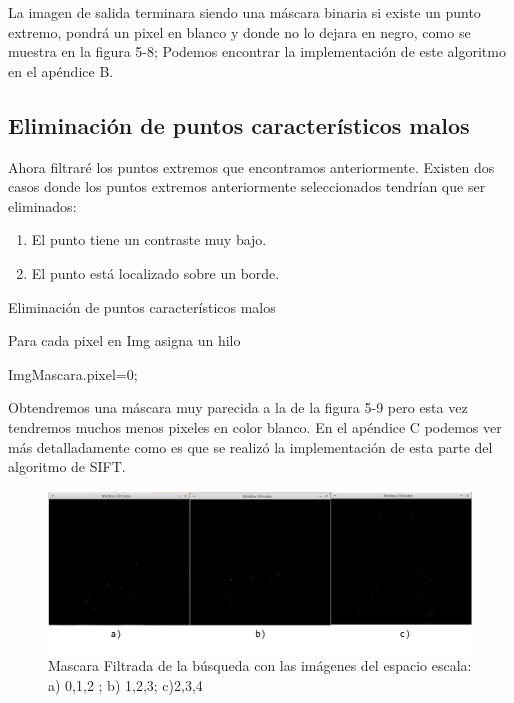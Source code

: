La imagen de salida terminara siendo una máscara binaria si existe un punto extremo, pondrá un pixel en blanco y donde no lo dejara en negro, como se muestra en la figura 5-8; Podemos encontrar la implementación de este algoritmo en el apéndice B. \pagebreak






\subsection{Eliminación de puntos característicos malos}

Ahora filtraré los puntos extremos que encontramos anteriormente. Existen dos casos donde los puntos extremos anteriormente seleccionados tendrían que ser eliminados:
	\begin{enumerate}
		\item El punto tiene un contraste muy bajo.
		\item El punto está localizado sobre un borde.
	\end{enumerate}		

\begin{algorithm}[H]
\caption{Eliminación de puntos característicos malos}
 Para cada pixel en Img asigna un hilo\;
 
 {
	{
		{
			ImgMascara.pixel=0;
		}
	
				
	}
	
	
		
}
	
\end{algorithm}

Obtendremos una máscara muy parecida a la de la figura 5-9 pero esta vez tendremos muchos menos pixeles en color blanco. En el apéndice C podemos ver más detalladamente como es que se realizó la implementación de esta parte del algoritmo de SIFT.

\begin{figure}[h]
			\centering
				\includegraphics[scale=0.3]{img/minmax.jpg}
			\caption{Mascara Filtrada de la búsqueda con las imágenes del espacio escala: a) 0,1,2 ; b) 1,2,3; c)2,3,4  }
\end{figure}



